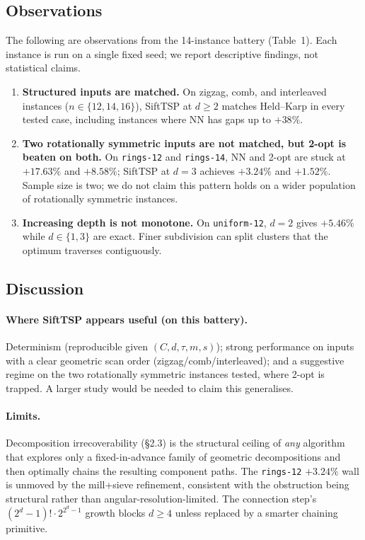 \documentclass[11pt,a4paper]{article}
\begin{document}
\subsection{Observations}

The following are observations from the 14-instance battery (Table~1).
Each instance is run on a single fixed seed; we report descriptive
findings, not statistical claims.

\begin{enumerate}
\item \textbf{Structured inputs are matched.} On zigzag, comb, and
interleaved instances ($n \in \{12, 14, 16\}$), SiftTSP at $d \geq 2$
matches Held--Karp in every tested case, including instances where NN
has gaps up to $+38\%$.
\item \textbf{Two rotationally symmetric inputs are not matched, but
2-opt is beaten on both.} On \texttt{rings-12} and \texttt{rings-14},
NN and 2-opt are stuck at $+17.63\%$ and $+8.58\%$; SiftTSP at $d=3$
achieves $+3.24\%$ and $+1.52\%$. Sample size is two; we do not claim
this pattern holds on a wider population of rotationally symmetric
instances.
\item \textbf{Increasing depth is not monotone.} On \texttt{uniform-12},
$d{=}2$ gives $+5.46\%$ while $d \in \{1, 3\}$ are exact. Finer
subdivision can split clusters that the optimum traverses contiguously.
\end{enumerate}

\subsection{Discussion}

\paragraph{Where SiftTSP appears useful (on this battery).} Determinism
(reproducible given $(C, d, \tau, m, s)$); strong performance on inputs
with a clear geometric scan order (zigzag/comb/interleaved); and a
suggestive regime on the two rotationally symmetric instances tested,
where 2-opt is trapped. A larger study would be needed to claim this
generalises.

\paragraph{Limits.} Decomposition irrecoverability (\S2.3) is the
structural ceiling of \emph{any} algorithm that explores only a
fixed-in-advance family of geometric decompositions and then optimally
chains the resulting component paths. The \texttt{rings-12} $+3.24\%$
wall is unmoved by the mill+sieve refinement, consistent with the
obstruction being structural rather than angular-resolution-limited.
The connection step's $(2^d - 1)! \cdot 2^{2^d - 1}$ growth blocks
$d \geq 4$ unless replaced by a smarter chaining primitive.
\end{document}
